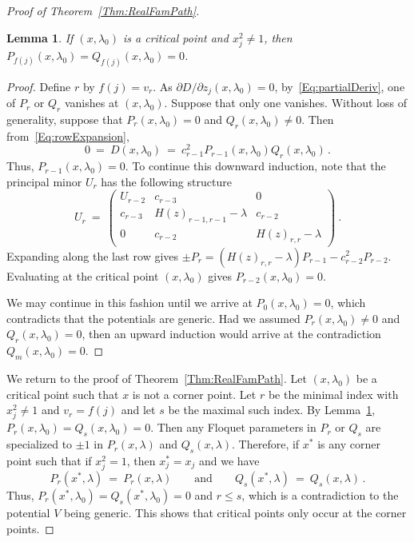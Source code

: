 \documentclass[12pt]{amsart}
\newtheorem{Lemma}[Theorem]{Lemma}
\theoremstyle{remark}
\begin{document}
\begin{proof}[Proof of Theorem~\ref{Thm:RealFamPath}]
\begin{Lemma}\label{Lem:myLem}
   If $(x,\lambda_0)$ is a critical point and $x_j^2\neq 1$, then 
   $P_{f(j)}(x,\lambda_0)= Q_{f(j)}(x,\lambda_0)=0$.
\end{Lemma}
\begin{proof}
  Define $r$ by $f(j)=v_r$.
  As $\partial D/\partial z_j(x,\lambda_0)=0$, by~\eqref{Eq:partialDeriv}, one of $P_r$ or $Q_r$ vanishes at $(x,\lambda_0)$.
  Suppose that only one vanishes.
  Without loss of generality, suppose that $P_r(x,\lambda_0)=0$ and $Q_r(x,\lambda_0)\neq 0$. 
  Then from~\eqref{Eq:rowExpansion},
 \[
   0\ =\ D(x,\lambda_0)\ =\ c_{r-1}^2 P_{r-1}(x,\lambda_0)Q_r(x,\lambda_0)\,.
 \]
  Thus, $P_{r-1}(x,\lambda_0)=0$.
  To continue this downward induction, note that the principal minor $U_r$ has the following structure
 \[
      U_r\ =\   \left( \begin{array}{c|c|c}
         U_{r-2}  &     c_{r-3}        & 0 \\\hline
         c_{r-3}  & H(z)_{r-1,r-1}-\lambda & c_{r-2}  \\\hline
            0    &     c_{r-2}           & H(z)_{r,r}-\lambda  \end{array}\right)\ .
 \]
  Expanding along the last row gives $\pm P_r = (H(z)_{r,r}-\lambda)P_{r-1} - c_{r-2}^2 P_{r-2}$.
  Evaluating at the critical point $(x,\lambda_0)$ gives $P_{r-2}(x,\lambda_0)=0$.

  We may continue in this fashion until we arrive at $P_0(x,\lambda_0)=0$, which contradicts that
  the potentials are generic.
  Had we assumed $P_r(x,\lambda_0)\neq 0$ and $Q_r(x,\lambda_0)=0$, then an upward induction would arrive at the
  contradiction $Q_m(x,\lambda_0)=0$.
 \end{proof}

  We return to the proof of Theorem~\ref{Thm:RealFamPath}.
  Let $(x,\lambda_0)$ be a critical point such that $x$ is not a corner point.
  Let $r$ be the minimal index with $x_j^2\neq 1$ and $v_r=f(j)$ and let $s$ be the maximal such index.
  By Lemma~\ref{Lem:myLem}, $P_r(x,\lambda_0)=Q_s(x,\lambda_0)=0$.
  Then any Floquet parameters in $P_r$ or $Q_s$ are specialized to $\pm 1$ in $P_r(x,\lambda)$ and $Q_s(x,\lambda)$.
  Therefore, if $x^*$ is any corner point such that if $x_j^2=1$, then $x^*_j=x_j$ and we have 
  \[
     P_r(x^*,\lambda)\ =\ P_r(x,\lambda)\qquad\mbox{and} \qquad
     Q_s(x^*,\lambda)\ =\ Q_s(x,\lambda)\,.
  \]
  Thus,  $P_r(x^*,\lambda_0)=Q_s(x^*,\lambda_0)=0$ and $r\leq s$, which is a contradiction to the potential $V$ being generic.
  This shows that  critical points only occur at the corner points.


\end{proof}
\end{document}
